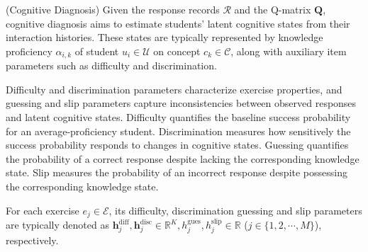 \documentclass[a4paper,runningheads]{llncs}
\begin{document}
\begin{definition}\label{def:cd}
(Cognitive Diagnosis) Given the response records $\mathcal{R}$ and the Q-matrix $\bm{Q}$, cognitive diagnosis aims to estimate students' latent cognitive states from their interaction histories. These states are typically represented by knowledge proficiency $\alpha_{i,k}$ of student $u_i \in \mathcal{U}$ on concept $c_k \in \mathcal{C}$, along with auxiliary item parameters such as difficulty and discrimination.
\end{definition}

\begin{definition}\label{def:ddgs}
Difficulty and discrimination parameters characterize exercise properties, and guessing and slip parameters capture inconsistencies between observed responses and latent cognitive states.
Difficulty quantifies the baseline success probability for an average-proficiency student.
Discrimination measures how sensitively the success probability responds to changes in cognitive states.
Guessing quantifies the probability of a correct response despite lacking the corresponding knowledge state.
Slip measures the probability of an incorrect response despite possessing the corresponding knowledge state.
\end{definition}

For each exercise $e_j\in\mathcal{E}$, its difficulty, discrimination guessing and slip parameters are typically denoted as $\bm{h}_j^{\text{diff}}, \bm{h}_j^{\text{disc}} \in \mathbb{R}^K, h_j^{\text{gues}}, h_j^{\text{slip}} \in \mathbb{R}$ ($j\in\{1,2,\cdots,M\}$), respectively.


\end{document}
